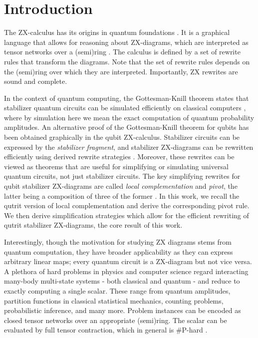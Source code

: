 \section{Introduction}



The ZX-calculus has its origins in
quantum foundations \cite{Coecke2011,vandewetering2020zxcalculus}.
It is a graphical language that allows for reasoning about ZX-diagrams,
which are interpreted as tensor networks over
a (semi)ring \cite{wang2020completeness}.
The calculus
is defined by a set of rewrite rules
that transform the diagrams.
Note that the set of rewrite rules depends on
the (semi)ring over which they are interpreted.
Importantly, ZX rewrites are sound and complete.


In the context of quantum computing,
the Gottesman-Knill theorem states that stabilizer quantum
circuits can be
simulated efficiently on classical computers \cite{Aaronson2004},
where by simulation here we mean the exact computation of quantum probability amplitudes.
An alternative
proof of the Gottesman-Knill theorem for qubits has been obtained graphically in the qubit ZX-calculus.
Stabilizer circuits can be expressed by the \emph{stabilizer
fragment},
and stabilizer ZX-diagrams can be rewritten efficiently
using derived rewrite strategies \cite{graph_theoretic_simplification}.
Moreover, these rewrites can be viewed as theorems
that are useful for simplifying or simulating universal quantum circuits, not just stabilizer circuits.
The key simplifying rewrites
for qubit stabilizer ZX-diagrams
are called \emph{local complementation} and \emph{pivot},
the latter being a composition of three of the former \cite{graph_theoretic_simplification}.
In this work, we recall the qutrit version of local complementation \cite{harny_completeness} and derive the corresponding pivot rule.
We then derive simplification strategies
which allow for the efficient rewriting of qutrit stabilizer ZX-diagrams,
the core result of this work.

Interestingly, though the motivation for studying ZX diagrams stems from quantum computation, they have broader applicability as they
can express arbitrary linear maps;
every quantum circuit is a ZX-diagram but not vice versa.
A plethora of hard problems in physics and computer science
regard interacting many-body multi-state systems - both classical and quantum -
and reduce to exactly computing a single scalar.
These range from quantum amplitudes,
partition functions in classical statistical mechanics,
counting problems, probabilistic inference, and many more.
Problem instances can be encoded as closed
tensor networks over an appropriate (semi)ring.
The scalar can be evaluated by full tensor contraction,
which in general is \#P-hard \cite{Damm2002}.



